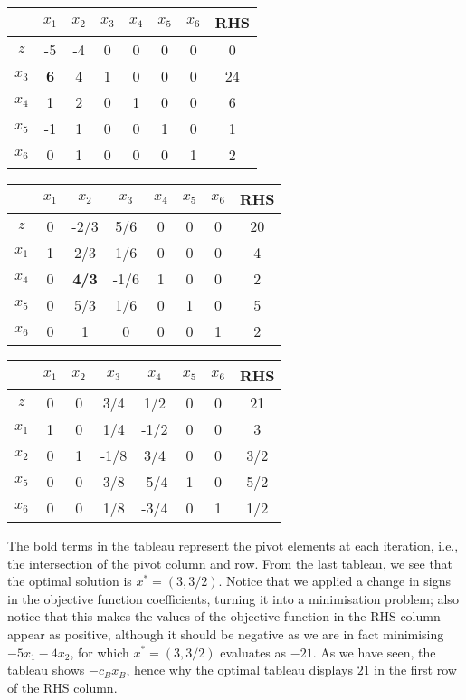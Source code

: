 \begin{center}
	\begin{tabular}{c|cccccc|c}
		 & $x_1$ & $x_2$ & $x_3$ & $x_4$ & $x_5$ & $x_6$ & RHS \\ \hline 
		$z$  & -5 & -4 & 0 & 0 & 0 & 0 & 0   \\ \hline
	   $x_3$ &  \bf{6} & 4 & 1 & 0 & 0 & 0 & 24 \\
	   $x_4$ &  1 & 2 & 0 & 1 & 0 & 0 & 6  \\
	   $x_5$ & -1 & 1 & 0 & 0 & 1 & 0 & 1  \\
	   $x_6$ &  0 & 1 & 0 & 0 & 0 & 1 & 2  \\ \hline \hline
	\end{tabular}
	
	\begin{tabular}{c|cccccc|c}
		 & $x_1$ & $x_2$ & $x_3$ & $x_4$ & $x_5$ & $x_6$ & RHS \\ \hline 
		$z$  & 0  & -2/3& 5/6 & 0 & 0 & 0 & 20   \\ \hline
	   $x_1$ & 1  & 2/3 & 1/6 & 0 & 0 & 0 & 4 \\
	   $x_4$ & 0  & \bf{4/3} &-1/6 & 1 & 0 & 0 & 2  \\
	   $x_5$ & 0  & 5/3 & 1/6 & 0 & 1 & 0 & 5  \\
	   $x_6$ & 0  & 1 & 0 & 0 & 0 & 1 & 2  \\ \hline \hline
	\end{tabular}
	
	\begin{tabular}{c|cccccc|c}
		     & $x_1$ & $x_2$ & $x_3$ & $x_4$ & $x_5$ & $x_6$ & RHS \\ \hline 
		$z$  & 0  & 0 & 3/4 & 1/2 & 0 & 0 & 21   \\ \hline
	   $x_1$ & 1  & 0 & 1/4 & -1/2 & 0 & 0 & 3 \\
	   $x_2$ & 0  & 1 &-1/8 & 3/4 & 0 & 0 & 3/2  \\
	   $x_5$ & 0  & 0 & 3/8 &-5/4 & 1 & 0 & 5/2  \\
	   $x_6$ & 0  & 0 & 1/8 &-3/4 & 0 & 1 & 1/2  \\ \hline \hline
	\end{tabular}
\end{center}

The bold terms in the tableau represent the pivot elements at each iteration, i.e., the intersection of the pivot column and row. From the last tableau, we see that the optimal solution is $x^* = (3, 3/2)$. Notice that we applied a change in signs in the objective function coefficients, turning it into a minimisation problem; also notice that this makes the values of the objective function in the RHS column appear as positive, although it should be negative as we are in fact minimising $-5x_1 - 4x_2$, for which $x^* = (3,3/2)$ evaluates as $-21$. As we have seen, the tableau shows $-c_B x_B$, hence why the optimal tableau displays $21$ in the first row of the RHS column.


